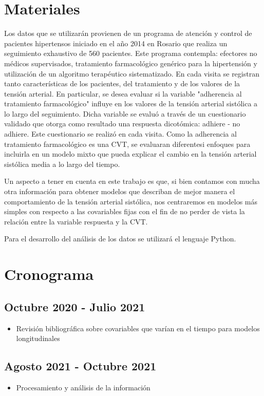 \documentclass[12pt]{article}
\def\npatients{560}
\def\fullcovname{adherencia al tratamiento farmacológico}
\begin{document}
\newpage
\section{Materiales}

Los datos que se utilizarán provienen de un programa de atención y control de pacientes hipertensos iniciado en el año 2014
en Rosario que realiza un seguimiento exhaustivo de \npatients{} pacientes. Este programa contempla: efectores no médicos
supervisados, tratamiento farmacológico genérico para la hipertensión y utilización de un algoritmo terapéutico sistematizado.
En cada visita se registran tanto características de los pacientes, del tratamiento y de los valores de la tensión arterial.
En particular, se desea evaluar si la variable "\fullcovname{}" influye en los valores de la tensión arterial
sistólica a lo largo del seguimiento. Dicha variable se evaluó a través de un cuestionario validado que otorga como resultado
una respuesta dicotómica: adhiere - no adhiere. Este cuestionario se realizó en cada visita. Como la \fullcovname{} es una CVT,
se evaluaran diferentesi enfoques para incluirla en un modelo mixto que pueda explicar el cambio en la tensión
arterial sistólica media a lo largo del tiempo.

Un aspecto a tener en cuenta en este trabajo es que, si bien contamos con mucha otra información para obtener modelos
que describan de mejor manera el comportamiento de la tensión arterial sistólica, nos centraremos en modelos más simples con
respecto a las covariables fijas con el fin de no perder de vista la relación entre la variable respuesta y la CVT.

Para el desarrollo del análisis de los datos se utilizará el lenguaje Python.

\newpage
\section{Cronograma}

\subsection*{Octubre 2020 - Julio 2021}
\begin{itemize}
	\item Revisión bibliográfica sobre covariables que varían en el tiempo para modelos longitudinales
\end{itemize}

\subsection*{Agosto 2021 - Octubre 2021}
\begin{itemize}
	\item Procesamiento y análisis de la información 
\end{itemize}
\end{document}
